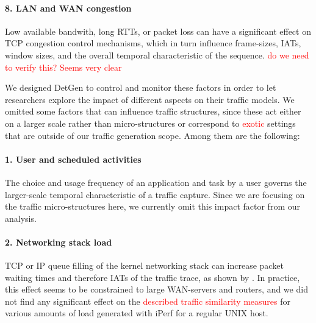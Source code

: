 \documentclass[sigconf]{acmart}
\begin{document}
\paragraph{8. LAN and WAN congestion}
Low available bandwith, long RTTs, or packet loss can have a significant effect on TCP congestion control mechanisms, which in turn influence frame-sizes, IATs, window sizes, and the overall temporal characteristic of the sequence. \textcolor{red}{do we need to verify this? Seems very clear}




\vspace{0.3cm}
We designed DetGen to control and monitor these factors in order to let researchers explore the impact of different aspects on their traffic models. We omitted some factors that can influence traffic structures, since these act either on a larger scale rather than micro-structures or correspond to \textcolor{red}{exotic} settings that are outside of our traffic generation scope. Among them are the following:




\paragraph{1. User and scheduled activities}
The choice and usage frequency of an application and task by a user governs the larger-scale temporal characteristic of a traffic capture. Since we are focusing on the traffic micro-structures here, we currently omit this impact factor from our analysis. 

\paragraph{2. Networking stack load}
TCP or IP queue filling of the kernel networking stack can increase packet waiting times and therefore IATs of the traffic trace, as shown by \cite{sequeira2013influence}. In practice, this effect seems to be constrained to large WAN-servers and routers, and we did not find any significant effect on the \textcolor{red}{described traffic similarity measures} for various amounts of load generated with iPerf for a regular UNIX host.


\end{document}
